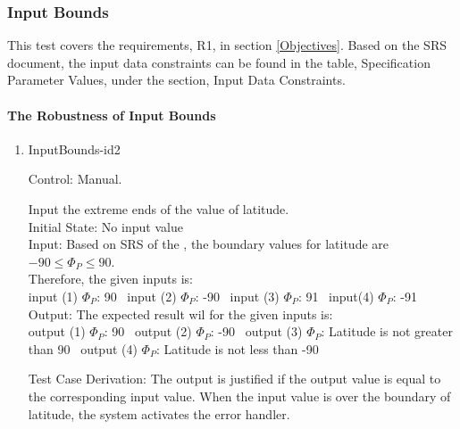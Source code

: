 \documentclass[12pt, titlepage]{article}
\begin{document}
\subsubsection{Input Bounds}

This test covers the requirements, R1, in section \ref{Objectives}. Based on
the SRS document\cite{YS2019}, the input data constraints can be found in the
table, Specification Parameter Values, under the section, Input Data
Constraints.

\paragraph{The Robustness of Input Bounds} 
\begin{enumerate}
\item{InputBounds-id2\\} 

Control: Manual. 

Input the extreme ends of the value of latitude.\\
Initial State: No input value\\
Input: Based on SRS \cite{YS2019} of the \progname{} \cite{YS2019}, the boundary
values for latitude are $-90 \leq \Phi_P \leq 90$. \\
Therefore, the given inputs is:\\
input (1) $\Phi_P$: 90 
~input (2) $\Phi_P$: -90 
~input (3) $\Phi_P$: 91 
~input(4) $\Phi_P$: -91\\ 

Output: The expected result wil for the given inputs is:\\
output (1) $\Phi_P$: 90 
~output (2) $\Phi_P$: -90 
~output (3) $\Phi_P$: Latitude is not greater than 90 
~output (4) $\Phi_P$: Latitude is not less than -90\\


Test Case Derivation: The output is justified if the output value is equal to
the corresponding input value. When the input value is over the boundary 
of latitude, the system activates the error handler. \\  


\end{enumerate}
\end{document}
